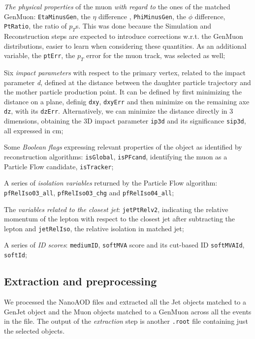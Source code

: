 \begin{outline}
\1 \emph{The physical properties} of the muon \emph{with regard to} the ones of the matched GenMuon: \texttt{EtaMinusGen}, the $\eta$ difference , \texttt{PhiMinusGen}, the $\phi$ difference, \texttt{PtRatio}, the ratio of $p_T$s. This was done because the Simulation and Reconstruction steps are expected to introduce corrections w.r.t. the GenMuon distributions, easier to learn when considering these quantities. As an additional variable, the \texttt{ptErr}, the $p_T$ error for the muon track, was selected as well;

\1 Six \emph{impact parameters} with respect to the primary vertex, related to the impact parameter \emph{d}, defined at the distance between the daughter particle trajectory and the mother particle production point. It can be defined by first minimizing the distance on a plane, definig \texttt{dxy}, \texttt{dxyErr} and then minimize on the remaining axe \texttt{dz}, with its \texttt{dzErr}. Alternatively, we can minimize the distance directly in 3 dimensions, obtaining the 3D impact parameter \texttt{ip3d} and its significance \texttt{sip3d}, all expressed in cm;

\1 Some \emph{Boolean flags} expressing relevant properties of the object as identified by reconstruction algorithms: \texttt{isGlobal}, \texttt{isPFcand}, identifying the muon as a Particle Flow candidate, \texttt{isTracker};

\1 A series of \emph{isolation variables} returned by the Particle Flow algorithm: \texttt{pfRelIso03\_all}, \texttt{pfRelIso03\_chg} and \texttt{pfRelIso04\_all};

\1 The \emph{variables related to the closest jet}: \texttt{jetPtRelv2}, indicating the relative momentum of the lepton with respect to the closest jet after subtracting the lepton and \texttt{jetRelIso}, the relative isolation in matched jet;

\1 A series of \emph{ID scores}: \texttt{mediumID}, \texttt{softMVA} score and its cut-based ID \texttt{softMVAId}, \texttt{softId};
\end{outline}

\subsection{Extraction and preprocessing}

We processed the NanoAOD files and extracted all the Jet objects matched to a GenJet object and the Muon objects matched to a GenMuon across all the events in the file.
The output of the \emph{extraction} step is another \texttt{.root} file containing just the selected objects.

